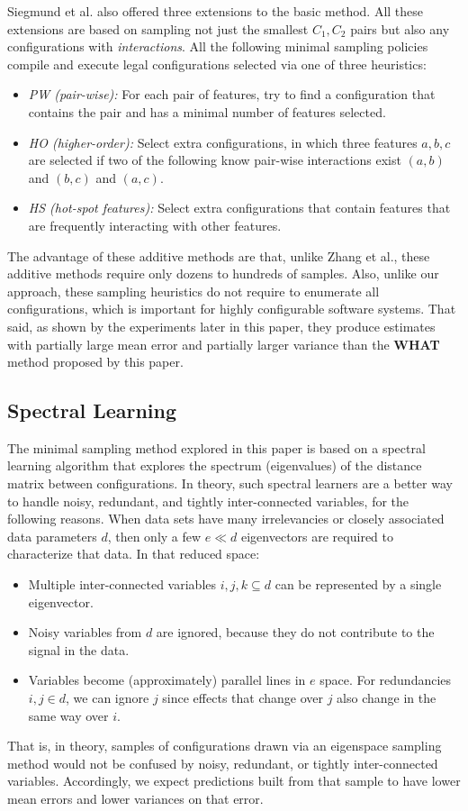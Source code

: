 \documentclass{sig-alternative}
\newcommand{\bi}{\begin{itemize}}%
\newcommand{\ei}{\end{itemize}}
\newcommand{\what}{{\bf WHAT }}
\begin{document}
Siegmund et al. also offered three extensions to the basic method. All these extensions are based on sampling
not just the smallest $C_1,C_2$  pairs but also any configurations with {\em interactions}. 
All the following minimal sampling policies compile and   execute legal configurations selected via one of three heuristics:
\bi
\item[{\em PW (pair-wise):}] For each pair of features, try to find a configuration that contains the pair and has a minimal number of features selected. 
\item[{\em HO (higher-order):}] Select extra configurations, in which three features $a,b,c$ are selected if two of the following know pair-wise interactions exist $(a,b)$ and $(b,c)$ and $(a,c)$.
\item[{\em HS (hot-spot features):}] Select extra configurations that contain features that are
frequently interacting with other features. 
\ei

The advantage of these additive methods are that, unlike  Zhang et al., these additive methods require only dozens to hundreds of samples. Also, unlike our approach, these sampling heuristics do not require to enumerate all configurations, which is important for highly configurable software systems. 
That said, as shown by the experiments later in this paper, they produce estimates with partially large mean error and partially larger variance than the \what method proposed by this paper.
 

\subsection{Spectral Learning}\label{sect:spect}

The minimal sampling method explored in this paper is based on a spectral learning algorithm
that  explores the spectrum (eigenvalues) of the distance matrix between  configurations.
In theory, such spectral learners are a better way to handle noisy, redundant, and tightly inter-connected variables, for the following reasons.
When data sets have many irrelevancies or closely associated data parameters $d$, then
only a few $e \ll d$ eigenvectors are required to characterize that data.
In that reduced space:
\bi
\item
Multiple inter-connected variables $i,j,k \subseteq d$ can be represented
by a single eigenvector.
\item
Noisy variables from $d$ are
ignored, because they  do not contribute to the signal in the data.
\item
Variables  become (approximately) parallel lines
in $e$ space. For  redundancies \mbox{$i,j \in d$}, we
can ignore $j$
since effects that change over $j$ also
change in the same way over $i$.
\ei
That is, in theory, samples of configurations drawn via an eigenspace sampling method
would not be confused by noisy, redundant, or tightly inter-connected variables. Accordingly,
we expect predictions built from that sample to have  lower mean errors and lower variances on that error.
\end{document}
